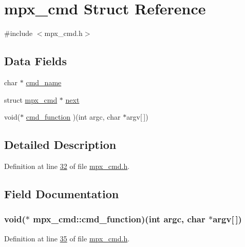 \hypertarget{structmpx__cmd}{
\section{mpx\_\-cmd Struct Reference}
\label{structmpx__cmd}
}


{\ttfamily \#include $<$mpx\_\-cmd.h$>$}

\subsection*{Data Fields}
\begin{DoxyCompactItemize}
\item 
char $\ast$ \hyperlink{structmpx__cmd_aeae73296151ffcec319820f4d8399e51}{cmd\_\-name}
\item 
struct \hyperlink{structmpx__cmd}{mpx\_\-cmd} $\ast$ \hyperlink{structmpx__cmd_a863c991d0d31b283791615b5f5fe03bb}{next}
\item 
void($\ast$ \hyperlink{structmpx__cmd_ad35d459cc43aac3f75fb308e07572253}{cmd\_\-function} )(int argc, char $\ast$argv\mbox{[}$\,$\mbox{]})
\end{DoxyCompactItemize}


\subsection{Detailed Description}


Definition at line \hyperlink{mpx__cmd_8h_source_l00032}{32} of file \hyperlink{mpx__cmd_8h_source}{mpx\_\-cmd.h}.



\subsection{Field Documentation}
\hypertarget{structmpx__cmd_ad35d459cc43aac3f75fb308e07572253}{
\subsubsection[{cmd\_\-function}]{\setlength{\rightskip}{0pt plus 5cm}void($\ast$ {\bf mpx\_\-cmd::cmd\_\-function})(int argc, char $\ast$argv\mbox{[}$\,$\mbox{]})}}
\label{structmpx__cmd_ad35d459cc43aac3f75fb308e07572253}


Definition at line \hyperlink{mpx__cmd_8h_source_l00035}{35} of file \hyperlink{mpx__cmd_8h_source}{mpx\_\-cmd.h}.

